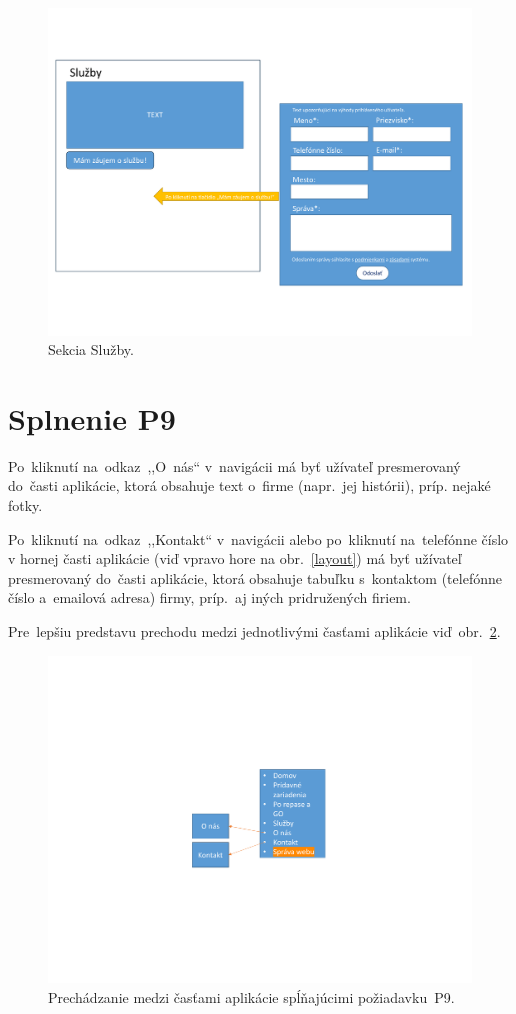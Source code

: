 \begin{figure}[H]\centering
\includegraphics[width=140mm]{../img/UI concept/services}
\caption{Sekcia Služby.}
\label{services}
\end{figure}

\section{Splnenie P9}

Po~kliknutí na~odkaz~,,O~nás`` v~navigácii má byť užívateľ presmerovaný do~časti aplikácie, ktorá obsahuje text o~firme (napr.~jej histórii), príp. nejaké fotky.

Po~kliknutí na~odkaz~,,Kontakt`` v~navigácii alebo po~kliknutí na~telefónne číslo v hornej časti aplikácie (viď vpravo hore na obr.~\ref{layout}) má byť užívateľ presmerovaný do~časti aplikácie, ktorá obsahuje tabuľku s~kontaktom (telefónne číslo a~emailová adresa) firmy, príp.~aj iných pridružených firiem.

Pre~lepšiu predstavu prechodu medzi jednotlivými časťami aplikácie viď~obr.~\ref{p9 graph}.

\begin{figure}[H]\centering
\includegraphics[width=140mm]{../img/UI concept/p9 graph}
\caption{Prechádzanie medzi časťami aplikácie spĺňajúcimi požiadavku~P9.}
\label{p9 graph}
\end{figure}

